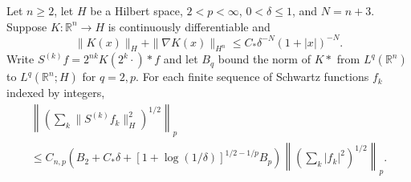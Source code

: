 Let $n\ge2$, let $H$ be a Hilbert space, $2<p<\infty$, $0<\delta\le1$, and $N=n+3$. Suppose $K:\mathbb R^n\to H$ is continuously differentiable and
\[
 \|K(x)\|_H+\|\nabla K(x)\|_{H^n}\le C_*\delta^{-N}(1+|x|)^{-N}.
\]
Write $S^{(k)}f=2^{nk}K(2^k\cdot)*f$ and let $B_q$ bound the norm of $K*$ from $L^q(\mathbb R^n)$ to $L^q(\mathbb R^n;H)$ for $q=2,p$. For each finite sequence of Schwartz functions $f_k$ indexed by integers,
\[
\begin{gathered}
 \left\|\left(\sum_k\|S^{(k)}f_k\|_H^2\right)^{1/2}\right\|_p \\
 \le C_{n,p}\left(B_2+C_*\delta+
 [1+\log(1/\delta)]^{1/2-1/p}B_p\right)
 \left\|\left(\sum_k|f_k|^2\right)^{1/2}\right\|_p.
\end{gathered}
\]

